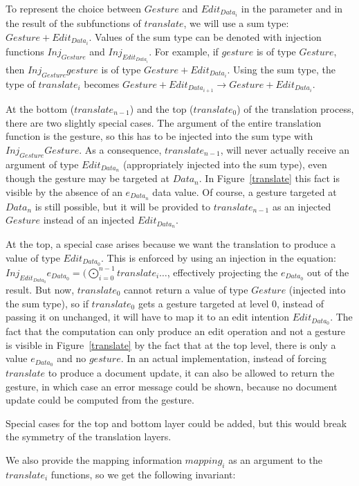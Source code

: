 To represent the choice between $Gesture$ and $Edit_{Data_i}$ in the parameter and in the result of the subfunctions of $translate$, we will use a sum type: $Gesture+Edit_{Data_i}$. Values of the sum type can be denoted with injection functions $Inj_{Gesture}$ and $Inj_{Edit_{Data_i}}$. For example, if $gesture$ is of type $Gesture$, then $Inj_{Gesture} gesture$ is of type $Gesture + Edit_{Data_i}$. Using the sum type, the type of $translate_i$ becomes $Gesture+Edit_{Data_{i+1}} \rightarrow Gesture+Edit_{Data_i}$. 

At the bottom ($translate_{n-1}$) and the top ($translate_0$) of the translation process, there are two slightly special cases. The argument of the entire translation function is the gesture, so this has to be injected into the sum type with $Inj_{Gesture} Gesture$. As a consequence, $translate_{n-1}$, will never actually receive an argument of type $Edit_{Data_n}$ (appropriately injected into the sum type), even though the gesture may be targeted at $Data_n$. In Figure~\ref{translate} this fact is visible by the absence of an $e_{Data_n}$ data value. Of course, a gesture targeted at $Data_n$ is still possible, but it will be provided to $translate_{n-1}$ as an injected $Gesture$ instead of an injected $Edit_{Data_n}$.

At the top, a special case arises because we want the translation to produce a value of type $Edit_{Data_0}$. This is enforced by using an injection in the equation: $Inj_{Edit_{Data_0}} e_{Data_0} = (\bigodot_{i=0}^{n-1} translate_i \dots$, effectively projecting the $e_{Data_0}$ out of the result. But now, $translate_0$ cannot return a value of type $Gesture$ (injected into the sum type), so if $translate_0$ gets a gesture targeted at level $0$, instead of passing it on unchanged, it will have to map it to an edit intention $Edit_{Data_0}$. The fact that the computation can only produce an edit operation and not a gesture is visible in Figure~\ref{translate} by the fact that at the top level, there is only a value $e_{Data_0}$ and no $gesture$. In an actual implementation, instead of forcing $translate$ to produce a document update, it can also be allowed to return the gesture, in which case an error message could be shown, because no document update could be computed from the gesture.

Special cases for the top and bottom layer could be added, but this would break the symmetry of the translation layers.

We also provide the mapping information $mapping_i$ as an argument to the $translate_i$ functions, so we get the following invariant: 

